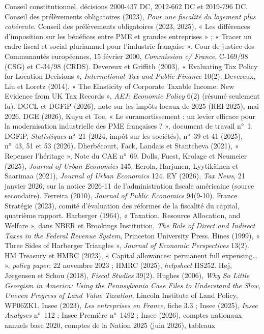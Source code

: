 {Conseil constitutionnel, décisions 2000-437 DC, 2012-662 DC et 2019-796 DC.
Conseil des prélèvements obligatoires (2023), \emph{Pour une fiscalité du logement plus cohérente}.
Conseil des prélèvements obligatoires (2023, 2025), « Les différences d'imposition sur les bénéfices entre PME
et grandes entreprises » ; « Tracer un cadre fiscal et social pluriannuel pour l'industrie française ».
Cour de justice des Communautés européennes, 15 février 2000, \emph{Commission c/ France}, C-169/98 (CSG) et C-34/98
(CRDS).
Devereux et Griffith (2003), « Evaluating Tax Policy for Location Decisions », \emph{International Tax and Public
Finance} 10(2).
Devereux, Liu et Loretz (2014), « The Elasticity of Corporate Taxable Income: New Evidence from UK Tax Records »,
\emph{AEJ: Economic Policy} 6(2) (résumé seulement lu).
DGCL et DGFiP (2026), note sur les impôts locaux de 2025 (REI 2025), mai 2026.
DGE (2026), Kuyu et Toe, « Le suramortissement : un levier efficace pour la modernisation industrielle des PME
françaises ? », document de travail n°~1.
DGFiP, \emph{Statistiques} n°~21 (2024, impôt sur les sociétés), n°~39 et 41 (2025), n°~43, 51 et 53 (2026).
Dherbécourt, Fack, Landais et Stantcheva (2021), « Repenser l'héritage », Note du CAE n°~69.
Dolls, Fuest, Krolage et Neumeier (2025), \emph{Journal of Urban Economics} 145.
Eerola, Harjunen, Lyytikäinen et Saarimaa (2021), \emph{Journal of Urban Economics} 124.
EY (2026), \emph{Tax News}, 21 janvier 2026, sur la notice 2026-11 de l'administration fiscale américaine (source
secondaire).
Ferreira (2010), \emph{Journal of Public Economics} 94(9-10).
France Stratégie (2023), comité d'évaluation des réformes de la fiscalité du capital, quatrième rapport.
Harberger (1964), « Taxation, Resource Allocation, and Welfare », dans NBER et Brookings Institution, \emph{The
Role of Direct and Indirect Taxes in the Federal Revenue System}, Princeton University Press.
Hines (1999), « Three Sides of Harberger Triangles », \emph{Journal of Economic Perspectives} 13(2).
HM Treasury et HMRC (2023), « Capital allowances: permanent full expensing… », \emph{policy paper}, 22 novembre 2023 ;
HMRC (2025), \emph{helpsheet} HS252.
Høj, Jørgensen et Schou (2018), \emph{Fiscal Studies} 39(2).
Hughes (2006), \emph{Why So Little Georgism in America: Using the Pennsylvania Case Files to Understand the Slow,
Uneven Progress of Land Value Taxation}, Lincoln Institute of Land Policy, WP06ZK1.
Insee (2023), \emph{Les entreprises en France}, fiche 3.3 ; Insee (2025), \emph{Insee Analyses} n°~112 ; Insee
Première n°~1492 ; Insee (2026), comptes nationaux annuels base 2020, comptes de la Nation 2025 (juin 2026), tableaux
}
